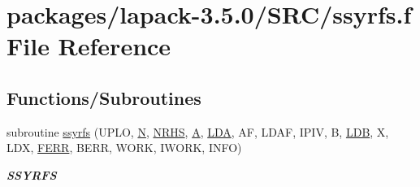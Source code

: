 \hypertarget{ssyrfs_8f}{}\section{packages/lapack-\/3.5.0/\+S\+R\+C/ssyrfs.f File Reference}
\label{ssyrfs_8f}
\subsection*{Functions/\+Subroutines}
\begin{DoxyCompactItemize}
\item 
subroutine \hyperlink{group__realSYcomputational_ga71a800843ac98f1a025a5ff437e6f9a3}{ssyrfs} (U\+P\+L\+O, \hyperlink{polmisc_8c_a0240ac851181b84ac374872dc5434ee4}{N}, \hyperlink{example__user_8c_aa0138da002ce2a90360df2f521eb3198}{N\+R\+H\+S}, \hyperlink{classA}{A}, \hyperlink{example__user_8c_ae946da542ce0db94dced19b2ecefd1aa}{L\+D\+A}, A\+F, L\+D\+A\+F, I\+P\+I\+V, B, \hyperlink{example__user_8c_a50e90a7104df172b5a89a06c47fcca04}{L\+D\+B}, X, L\+D\+X, \hyperlink{superlu__enum__consts_8h_af00a42ecad444bbda75cde1b64bd7e72a78fd14d7abebae04095cfbe02928f153}{F\+E\+R\+R}, B\+E\+R\+R, W\+O\+R\+K, I\+W\+O\+R\+K, I\+N\+F\+O)
\begin{DoxyCompactList}\small\item\em {\bfseries S\+S\+Y\+R\+F\+S} \end{DoxyCompactList}\end{DoxyCompactItemize}
